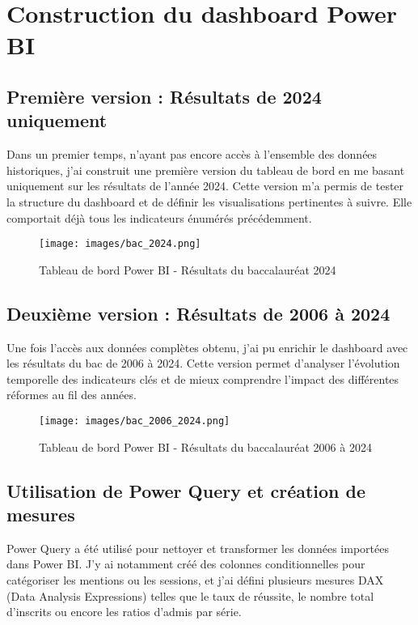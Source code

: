 \newpage
\section{Construction du dashboard Power BI}

\subsection{Première version : Résultats de 2024 uniquement}

Dans un premier temps, n’ayant pas encore accès à l’ensemble des données historiques, 
j’ai construit une première version du tableau de bord en me basant uniquement sur les résultats de l’année 2024. 
Cette version m’a permis de tester la structure du dashboard et de définir les visualisations pertinentes à suivre. 
Elle comportait déjà tous les indicateurs énumérés précédemment.
\vspace{1cm}
\begin{figure}[htbp]
    \centering
    \caption{Tableau de bord Power BI - Résultats du baccalauréat 2024}
    \texttt{[image: images/bac\_2024.png]}
\end{figure}

\newpage
\subsection{ Deuxième version : Résultats de 2006 à 2024}

Une fois l’accès aux données complètes obtenu, j’ai pu enrichir le dashboard avec les résultats du bac de 2006 à 2024. 
Cette version permet d’analyser l’évolution temporelle des indicateurs clés et de mieux comprendre l’impact des différentes réformes au fil des années.
\vspace{1cm}
\begin{figure}[htbp]
    \centering
    \caption{Tableau de bord Power BI - Résultats du baccalauréat 2006 à 2024}
    \texttt{[image: images/bac\_2006\_2024.png]}
\end{figure}

\newpage
\subsection{Utilisation de Power Query et création de mesures}

Power Query a été utilisé pour nettoyer et transformer les données importées dans Power BI. 
J’y ai notamment créé des colonnes conditionnelles pour catégoriser les mentions ou les sessions, 
et j’ai défini plusieurs mesures DAX (Data Analysis Expressions) telles que le taux de réussite, 
le nombre total d’inscrits ou encore les ratios d’admis par série.

